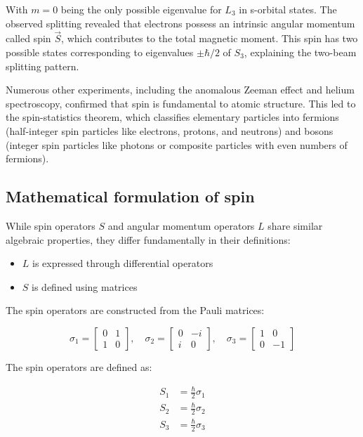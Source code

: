 \documentclass[italian]{HKNdocument}
\begin{document}
With $m=0$ being the only possible eigenvalue for $L_3$ in s-orbital states. The observed splitting revealed that electrons possess an intrinsic angular momentum called spin $\vec{S}$, which contributes to the total magnetic moment. This spin has two possible states corresponding to eigenvalues $\pm\hbar/2$ of $S_3$, explaining the two-beam splitting pattern.

Numerous other experiments, including the anomalous Zeeman effect and helium spectroscopy, confirmed that spin is fundamental to atomic structure. This led to the spin-statistics theorem, which classifies elementary particles into fermions (half-integer spin particles like electrons, protons, and neutrons) and bosons (integer spin particles like photons or composite particles with even numbers of fermions).

\subsection{Mathematical formulation of spin}
While spin operators $S$ and angular momentum operators $L$ share similar algebraic properties, they differ fundamentally in their definitions:

\begin{itemize}
  \item $L$ is expressed through differential operators
  \item $S$ is defined using matrices
\end{itemize}

The spin operators are constructed from the Pauli matrices:

\[
\sigma_{1}=\left[\begin{array}{ll}
0 & 1  \label{eq:11.4}\\
1 & 0
\end{array}\right], \quad \sigma_{2}=\left[\begin{array}{cc}
0 & -i \\
i & 0
\end{array}\right], \quad \sigma_{3}=\left[\begin{array}{cc}
1 & 0 \\
0 & -1
\end{array}\right]
\]

The spin operators are defined as:

\begin{align}
S_{1} & =\frac{\hbar}{2} \sigma_{1} \\
S_{2} & =\frac{\hbar}{2} \sigma_{2}  \label{eq:11.5}\\
S_{3} & =\frac{\hbar}{2} \sigma_{3}
\end{align}
\end{document}
